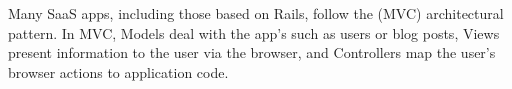 Many SaaS apps, including those based on Rails,
follow the  (MVC) architectural
pattern. In MVC, Models deal with the
app's  such as users or blog posts,
Views present
information to the user via the browser, and Controllers  map the
user's browser actions to application code.
